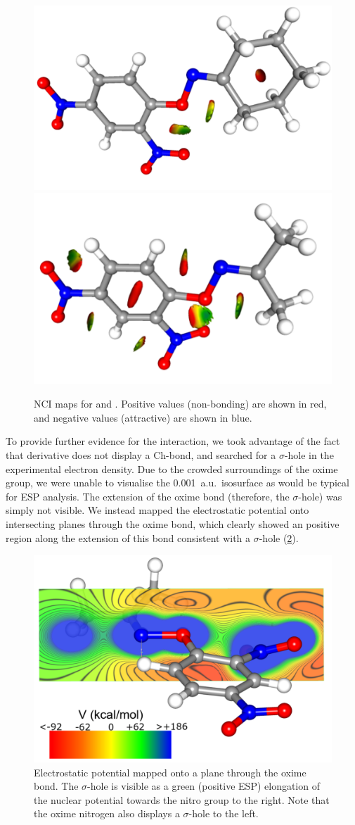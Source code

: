 \begin{refsection}
\begin{figure}
	\centering
	\includegraphics[angle=90,width=0.35\columnwidth]{Figures/cyclohexanone-oxime-dnp-nci.pdf}
	\includegraphics[angle=90,width=0.35\columnwidth]{Figures/acetone-oxime-dnp-nci.pdf}
	\caption[NCI maps for  and .]{NCI maps for  and . Positive values (non-bonding) are shown in red, and negative values (attractive) are shown in blue.}\label{fig:NCI}
\end{figure}

To provide further evidence for the interaction, we took advantage of the fact that derivative  does not display a Ch-bond, and searched for a $\sigma$-hole in the experimental electron density.
Due to the crowded surroundings of the oxime group, we were unable to visualise the 0.001~a.u.\ isosurface as would be typical for ESP analysis.
The extension of the oxime bond (therefore, the $\sigma$-hole) was simply not visible.
We instead mapped the electrostatic potential onto intersecting planes through the oxime bond, which clearly showed an positive region along the extension of this bond consistent with a $\sigma$-hole (\cref{fig:acetone-esp}).

\begin{figure}
	\centering
	\includegraphics[width=0.6\columnwidth]{Figures/acetone-oxime-dnp-esp.pdf}
	\caption[Electrostatic potential mapped onto a plane through the oxime bond.]{Electrostatic potential mapped onto a plane through the oxime bond. The $\sigma$-hole is visible as a green (positive ESP) elongation of the nuclear potential towards the nitro group to the right. Note that the oxime nitrogen also displays a $\sigma$-hole to the left.}\label{fig:acetone-esp}
\end{figure}


\end{refsection}
